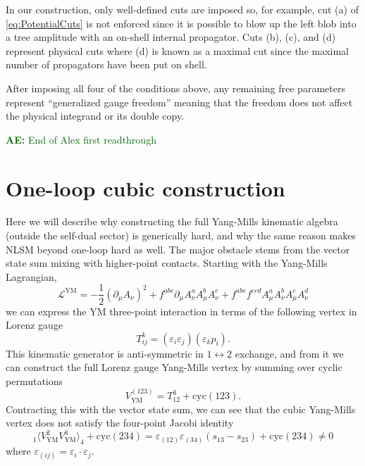 \documentclass[11pt,letter]{article}
\newcommand{\ace}[1]{\textcolor{darkgreen}{\textbf{AE:}{ #1}}}
\begin{document}
In our construction, only well-defined cuts are imposed so, for
example, cut (a) of \cref{eq:PotentialCuts} is not enforced since it
is possible to blow up the left blob into a tree amplitude with an
on-shell internal propagator.  Cuts (b), (c), and (d) represent
physical cuts where (d) is known as a maximal cut since the maximal
number of propagators have been put on shell.  \fi

After imposing all four of the conditions above, any remaining free
parameters represent ``generalized gauge freedom'' meaning that the
freedom does not affect the physical integrand or its double copy.

\ace{End of Alex first readthrough}

\section{One-loop cubic construction}
\label{sec:cubic}
Here we will describe why constructing the full Yang-Mills kinematic
algebra (outside the self-dual sector) is generically hard, and why
the same reason makes NLSM beyond one-loop hard as well. The major
obstacle stems from the vector state sum mixing with higher-point
contacts. Starting with the Yang-Mills Lagrangian,
\begin{equation}
  \mathcal{L}^{\text{YM}} = -\frac{1}{2}(\partial_\mu A_\nu)^2
  + f^{abc} \partial_\mu A^a_\nu A^b_\mu A^c_\nu
  + f^{abe}f^{ecd}A^a_\mu A^b_\nu  A^c_\mu A^d_\nu 
\end{equation}
we can express the YM three-point interaction in terms of the
following vertex in Lorenz gauge
\begin{equation}
T^k_{ij} = (\varepsilon_i\varepsilon_j)(\varepsilon_k p_i).
\end{equation}
This kinematic generator is anti-symmetric in $1\leftrightarrow 2$
exchange, and from it we can construct the full Lorenz gauge
Yang-Mills vertex by summing over cyclic permutations
\begin{equation}
V^{(123)}_{\text{YM}} = T^3_{12} +\text{cyc}(123).
\end{equation}
Contracting this with the vector state sum, we can see that the cubic
Yang-Mills vertex does not satisfy the four-point Jacobi identity
\begin{equation}
  \label{cubicJac}
  {}_1\langle V^{2}_{\text{YM}}V^{3}_{\text{YM}}\rangle_4+\text{cyc}(234) = \varepsilon_{(12)}  \varepsilon_{(34)} (s_{13}-s_{23}) +\text{cyc}(234) \neq 0
\end{equation}
where $ \varepsilon_{(ij)} = \varepsilon_{i}\cdot \varepsilon_{j}$.
\end{document}
